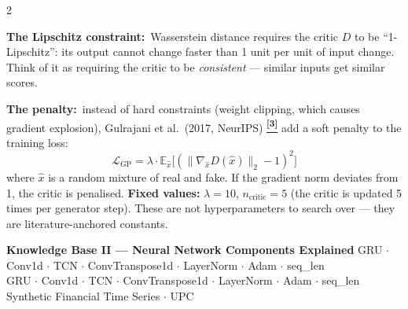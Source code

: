 \documentclass[10pt]{article}
\newcommand{\purplebox}[2]{\begin{tcolorbox}[mybox={Purple}{LBg},title={#1}]#2\end{tcolorbox}}
\newcommand{\pagehead}[2]{%
  \begin{tcolorbox}[enhanced,arc=0pt,outer arc=0pt,boxrule=0pt,
    colback=Navy,colframe=Navy,
    top=5pt,bottom=5pt,left=8pt,right=8pt,
    before skip=0pt,after skip=10pt]
  {\color{white}\large\bfseries #1}%
  \ifx\relax#2\relax\else\\[1pt]{\color{blue!30!white}\small #2}\fi
  \hfill{\color{blue!20!white}\footnotesize Synthetic Financial Time Series $\cdot$ UPC}
  \end{tcolorbox}}
\newcommand{\tcite}[1]{%
  \hyperlink{R:#1}{\textsuperscript{\scriptsize\textbf{[#1]}}}}
\newcommand{\E}{\mathbb{E}}
\begin{document}
\begin{multicols}{2}
\purplebox{Fix 2 --- Gradient Penalty (WGAN-GP)}{%
\textbf{The Lipschitz constraint:}\ Wasserstein distance requires the critic $D$ to be ``1-Lipschitz'': its output cannot change faster than 1 unit per unit of input change. Think of it as requiring the critic to be \emph{consistent} --- similar inputs get similar scores.

\smallskip
\textbf{The penalty:}\ instead of hard constraints (weight clipping, which causes gradient explosion), Gulrajani et al.\ (2017, NeurIPS)\tcite{3} add a soft penalty to the training loss:
\begin{equation*}
  \mathcal{L}_\text{GP} = \lambda \cdot \E_{\hat{x}}
  \bigl[(\|\nabla_{\hat{x}}D(\hat{x})\|_2 - 1)^2\bigr]
\end{equation*}
where $\hat{x}$ is a random mixture of real and fake. If the gradient norm deviates from 1, the critic is penalised. \textbf{Fixed values:} $\lambda=10$, $n_\text{critic}=5$ (the critic is updated 5 times per generator step). These are not hyperparameters to search over --- they are literature-anchored constants.}

\end{multicols}

\clearpage

\pagehead{Knowledge Base II --- Neural Network Components Explained}
         {GRU $\cdot$ Conv1d $\cdot$ TCN $\cdot$ ConvTranspose1d $\cdot$ LayerNorm $\cdot$ Adam $\cdot$ seq\_len}
\end{document}
